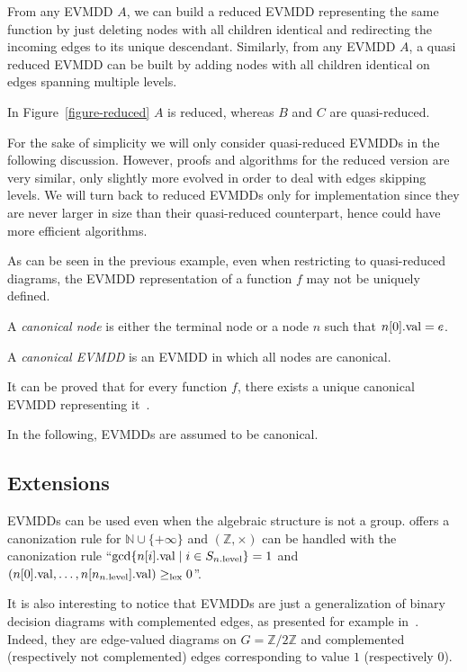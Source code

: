 \documentclass[a4paper,oneside,11pt,pdftex]{llncs}
\newcommand{\N}{\mathbb{N}}
\newcommand{\Z}{\mathbb{Z}}
\newcommand{\val}[1]{#1{\rm .val}}
\newcommand{\level}[1]{#1{\rm .level}}
\begin{document}
From any EVMDD $A$, we can build a reduced EVMDD representing the same function
by just deleting nodes with all children identical and redirecting the incoming edges to its unique descendant.
Similarly, from any EVMDD $A$, a quasi reduced EVMDD can be built by adding
nodes with all children identical on edges spanning multiple levels.

\begin{example}
In Figure~\vref{figure-reduced} $A$ is reduced, whereas $B$ and $C$ are quasi-reduced.
\end{example}

For the sake of simplicity we will only consider quasi-reduced EVMDDs in the following discussion. However, proofs and algorithms for the reduced version are very similar, only slightly more evolved in order to deal with edges skipping levels. We will turn back to reduced EVMDDs only for implementation since they are never larger in size than their quasi-reduced counterpart, hence could have more efficient algorithms.

As can be seen in the previous example, even when restricting to quasi-reduced diagrams,
the EVMDD representation of a function $f$ may not be uniquely defined.

\begin{definition}
A \emph{canonical node} is either the terminal node or a node $n$ such that $\val{n[0]} = e$.

A \emph{canonical EVMDD} is an EVMDD in which all nodes are canonical.
\end{definition}

It can be proved that for every function $f$, there exists a unique
canonical EVMDD representing it~\cite{FMCAD2002}.

In the following, EVMDDs are assumed to be canonical.

\subsection{Extensions%
  \label{subsection-extensions}}

EVMDDs can be used even when the algebraic structure is not a group.
\cite{FMCAD2002} offers a canonization rule for $\N\cup \{+\infty\}$ and
$(\Z, \times)$ can be handled with the canonization rule
``${\rm gcd}\{\val{n[i]}\;|\; i \in S_{\level{n}}\} = 1$ and
$(\val{n[0]},\ldots, \val{n[n_{\level{n}}]}) \geq_{\rm lex} 0$''.

It is also interesting to notice that EVMDDs are just a generalization
of binary decision diagrams with complemented edges, as presented for example
in~\cite{Brace1990}. Indeed, they are edge-valued diagrams on $G = \Z/2\Z$
and complemented (respectively not complemented) edges corresponding to value $1$ (respectively $0$).
\end{document}
